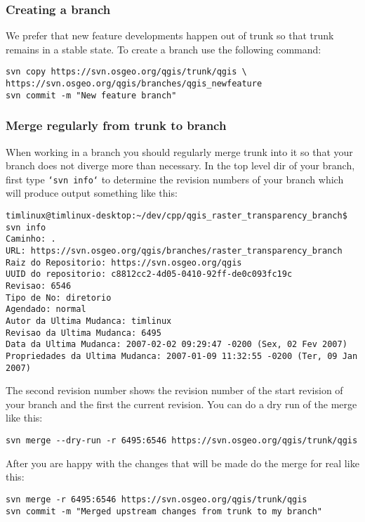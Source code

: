 \subsubsection{Creating a branch}
We prefer that new feature developments happen out of trunk so that trunk
remains in a stable state. To create a branch use the following command:

\begin{verbatim}
svn copy https://svn.osgeo.org/qgis/trunk/qgis \
https://svn.osgeo.org/qgis/branches/qgis_newfeature
svn commit -m "New feature branch"
\end{verbatim}

\subsubsection{Merge regularly from trunk to branch}
When working in a branch you should regularly merge trunk into it so that your
branch does not diverge more than necessary. In the top level dir of your
branch, first type \texttt{`svn info`} to determine the revision numbers of your
branch which will produce output something like this:

\begin{verbatim}
timlinux@timlinux-desktop:~/dev/cpp/qgis_raster_transparency_branch$ svn info
Caminho: .
URL: https://svn.osgeo.org/qgis/branches/raster_transparency_branch
Raiz do Repositorio: https://svn.osgeo.org/qgis
UUID do repositorio: c8812cc2-4d05-0410-92ff-de0c093fc19c
Revisao: 6546
Tipo de No: diretorio
Agendado: normal
Autor da Ultima Mudanca: timlinux
Revisao da Ultima Mudanca: 6495
Data da Ultima Mudanca: 2007-02-02 09:29:47 -0200 (Sex, 02 Fev 2007)
Propriedades da Ultima Mudanca: 2007-01-09 11:32:55 -0200 (Ter, 09 Jan 2007)
\end{verbatim}

The second revision number shows the revision number of the start revision of
your branch and the first the current revision. You can do a dry run of the
merge like this:

\begin{verbatim}
svn merge --dry-run -r 6495:6546 https://svn.osgeo.org/qgis/trunk/qgis
\end{verbatim}

After you are happy with the changes that will be made do the merge for real
like this:

\begin{verbatim}
svn merge -r 6495:6546 https://svn.osgeo.org/qgis/trunk/qgis
svn commit -m "Merged upstream changes from trunk to my branch"
\end{verbatim}

